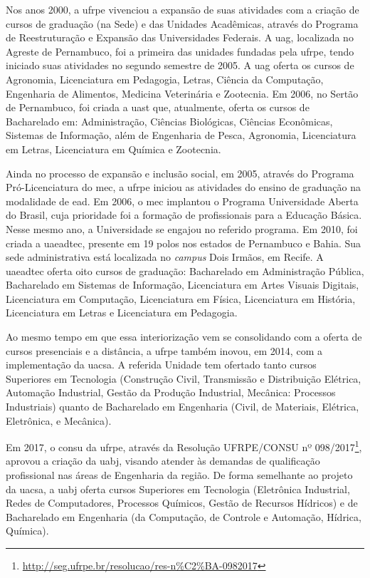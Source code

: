 \documentclass[
	12pt,				%
	openright,			%
  oneside,     %
	a4paper,			%
 hyphens,
	chapter=TITLE,		%
	english,			%
	french,				%
	spanish,			%
	brazil				%
	]{abntex2}
\begin{document}
Nos anos 2000, a \acrshort{ufrpe} vivenciou a expansão de suas atividades com a criação de cursos de graduação (na Sede) e das Unidades Acadêmicas, através do Programa de Reestruturação e Expansão das Universidades Federais. A \acrshort{uag}, localizada no Agreste de Pernambuco, foi a primeira das unidades fundadas pela \acrshort{ufrpe}, tendo iniciado suas atividades no segundo semestre de 2005. A \acrshort{uag} oferta os cursos de Agronomia, Licenciatura em Pedagogia, Letras, Ciência da Computação, Engenharia de Alimentos, Medicina Veterinária e Zootecnia. 
Em 2006, no Sertão de Pernambuco, foi criada a \acrfull{uast} que, atualmente, oferta os cursos de Bacharelado em: Administração, Ciências Biológicas, Ciências Econômicas, Sistemas de Informação, além de Engenharia de Pesca, Agronomia, Licenciatura em Letras, Licenciatura em Química e Zootecnia.

Ainda no processo de expansão e inclusão social, em 2005, através do Programa Pró-Licenciatura do \acrfull{mec}, a \acrshort{ufrpe} iniciou as atividades do ensino de graduação na modalidade de \acrshort{ead}. Em 2006, o \acrshort{mec} implantou o Programa Universidade Aberta do Brasil, cuja prioridade foi a formação de profissionais para a Educação Básica. Nesse mesmo ano, a Universidade se engajou no referido programa. Em 2010, foi criada a \acrfull{uaeadtec}, presente em 19 polos nos estados de Pernambuco e Bahia. Sua sede administrativa está localizada no \textit{campus} Dois Irmãos, em Recife. A \acrshort{uaeadtec} oferta oito cursos de graduação: Bacharelado em Administração Pública, Bacharelado em Sistemas de Informação, Licenciatura em Artes Visuais Digitais, Licenciatura em Computação, Licenciatura em Física, Licenciatura em História, Licenciatura em Letras e Licenciatura em Pedagogia.

Ao mesmo tempo em que essa interiorização vem se consolidando com a oferta de cursos presenciais e a distância, a \acrshort{ufrpe} também inovou, em 2014, com a implementação da \acrfull{uacsa}. A referida Unidade tem ofertado tanto cursos Superiores em Tecnologia (Construção Civil, Transmissão e Distribuição Elétrica, Automação Industrial, Gestão da Produção Industrial, Mecânica: Processos Industriais) quanto de Bacharelado em Engenharia (Civil, de Materiais, Elétrica, Eletrônica, e Mecânica).

Em 2017, o \acrfull{consu} da \acrshort{ufrpe}, através da Resolução UFRPE/CONSU nº 098/2017\footnote{\url{http://seg.ufrpe.br/resolucao/res-n\%C2\%BA-0982017}}, aprovou a criação da \acrfull{uabj}, visando atender às demandas de qualificação profissional nas áreas de Engenharia da região. De forma semelhante ao projeto da \acrshort{uacsa}, a \acrshort{uabj} oferta cursos Superiores em Tecnologia (Eletrônica Industrial, Redes de Computadores, Processos Químicos, Gestão de Recursos Hídricos) e de Bacharelado em Engenharia (da Computação, de Controle e Automação, Hídrica, Química).
\end{document}
